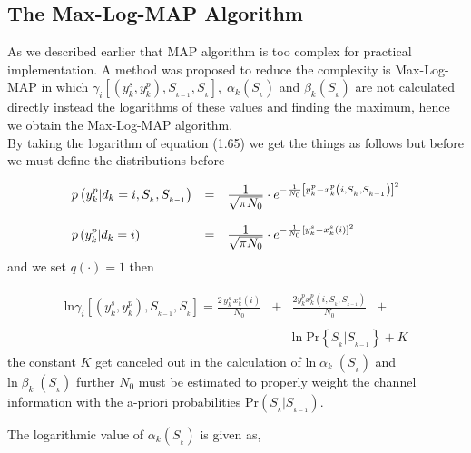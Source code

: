 \subsection{The Max-Log-MAP Algorithm}
As we described earlier that MAP algorithm is too complex for practical implementation. A method was proposed to reduce the complexity is Max-Log-MAP in which $\gamma_i \left[\left(y_k^{s},y_k^{p}\right),S_{_{k-1}},S_{_{k}}\right],\;\alpha_k(S_{_{k}})$ and $\beta_{k}(S_{_{k}})$ are not calculated directly instead the logarithms of these values and finding the maximum, hence we obtain the Max-Log-MAP algorithm.\\

By taking the logarithm of equation (1.65) we get the things as follows but before we must define the distributions before

\begin{eqnarray}
\begin{array}{lll}
p\left(y_k^{p}\vert d_k=i,S_{_{k}},S_{_{k-1}}\right)&=&\frac{\hbox{$1$}}{\hbox{$\sqrt{\pi N_0}$}}\cdot e^{-\frac{1}{N_0}\left[y_k^{p}-x_k^{p}\left(i,S_{_{k}},S_{_{k-1}}\right)\right]^2} \\ \\
p\left(y_k^{p}\vert d_k=i\right)&=&\frac{\hbox{$1$}}{\hbox{$\sqrt{\pi N_0}$}}\cdot e^{-\frac{1}{N_0}\left[y_k^{s}-x_k^{s}(i)\right]^2}
\end{array}
\end{eqnarray}
and we set $q(\cdot)=1$ then

\begin{eqnarray}
\begin{array}{lll}
\mathrm{ln}\gamma_i\left [\left( y_k^s,y_k^p \right),S_{_{k-1}},S_{_{k}} \right ]=\frac{2\,y_k^s\,x_k^s(i)}{N_0}&+& \frac{2y_k^p x_k^p(i,S_{_{k}},S_{_{k-1}})}{N_0}\;\; + \;\; \\ \\
&&\mathrm{ln\;Pr}\left\{S_{_{k}}\vert S_{_{k-1}} \right \} + K
\end{array}
\end{eqnarray}
the constant $K$ get canceled out in the calculation of $\mathrm{ln}\;\alpha_k\;(S_{_{k}})$ and $\mathrm{ln}\;\beta_k\;(S_{_{k}})$ further $N_0$ must be estimated to properly weight the channel information with the a-priori probabilities $\mathrm{Pr}(S_{_{k}}\vert S_{_{k-1}})$.

The logarithmic value of $\alpha_k(S_{_{k}})$ is given as,


